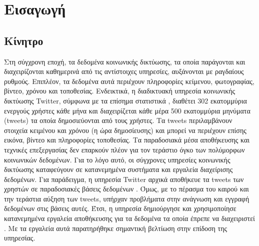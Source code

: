 \def\chaptername{Κεφάλαιο}
\chapter{Εισαγωγή}
\def\chaptername{Chapter}

\section{Κίνητρο}

Στη σύγχρονη εποχή, τα δεδομένα κοινωνικής δικτύωσης, τα οποία παράγονται και  
διαχειρίζονται καθημερινά από τις αντίστοιχες υπηρεσίες, αυξάνονται με ραγδαίους ρυθμούς. 
Επιπλέον, τα δεδομένα αυτά περιέχουν πληροφορίες κείμενου, φωτογραφίας, βίντεο, χρόνου και τοποθεσίας. Ενδεικτικά, η διαδικτυακή υπηρεσία κοινωνικής δικτύωσης Twitter, 
σύμφωνα με τα επίσημα στατιστικά \cite{1}, διαθέτει 302 εκατομμύρια ενεργούς χρήστες κάθε μήνα και διαχειρίζεται κάθε μέρα 500 εκατομμύρια μηνύματα (tweets) 
τα οποία δημοσιεύονται από τους χρήστες. Τα tweets περιλαμβάνουν στοιχεία κειμένου και χρόνου (η ώρα δημοσίευσης) και μπορεί να περιέχουν επίσης 
εικόνα, βίντεο και \linebreak πληροφορίες τοποθεσίας. Τα παραδοσιακά μέσα αποθήκευσης και τεχνικές επεξεργασίας δεν \linebreak επαρκούν πλέον για τον τεράστιο όγκο των πολύμορφων 
κοινωνικών δεδομένων. Για το λόγο αυτό, οι σύγχρονες υπηρεσίες κοινωνικής δικτύωσης 
καταφεύγουν σε κατανεμημένα συστήματα και εργαλεία διαχείρισης δεδομένων. Για παράδειγμα, η υπηρεσία Twitter αρχικά 
αποθήκευε τα tweets των \linebreak χρηστών σε παραδοσιακές βάσεις δεδομένων \cite{2}. Όμως, με το πέρασμα του καιρού και την τεράστια αύξηση των 
tweets, υπήρχαν προβλήματα στην ανάγνωση και εγγραφή δεδομένων στις βάσεις αυτές. Έτσι, η υπηρεσία δημιούργησε και χρησιμοποίησε κατανεμημένα εργαλεία αποθήκευσης 
για τα \linebreak δεδομένα τα οποία έπρεπε να διαχειριστεί \cite{4}. Με τα εργαλεία αυτά παρατηρήθηκε σημαντική \linebreak βελτίωση στην επίδοση της υπηρεσίας. 

